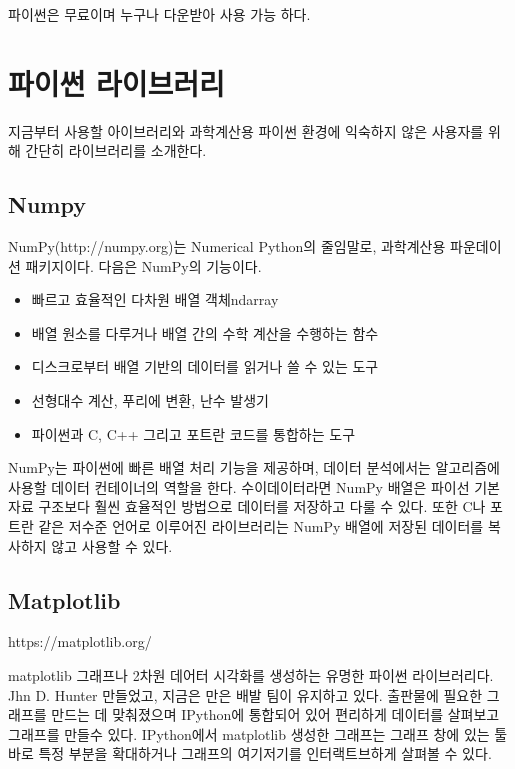 파이썬은 무료이며 누구나 다운받아 사용 가능 하다.



\section{파이썬 라이브러리}

지금부터 사용할 아이브러리와 과학계산용 파이썬 환경에 익숙하지 않은 사용자를 위해 간단히 라이브러리를 소개한다.

\subsection{Numpy}

NumPy(http://numpy.org)는 Numerical Python의 줄임말로, 과학계산용 파운데이션 패키지이다. 다음은 NumPy의 기능이다.


\begin{itemize}
	\item{빠르고 효율적인 다차원 배열 객체ndarray}
	\item{배열 원소를 다루거나 배열 간의 수학 계산을 수행하는 함수}
	\item{디스크로부터 배열 기반의 데이터를 읽거나 쓸 수 있는 도구}
	\item{선형대수 계산, 푸리에 변환, 난수 발생기}
	\item{파이썬과 C, C++ 그리고 포트란 코드를 통합하는 도구}
\end{itemize}


NumPy는 파이썬에 빠른 배열 처리 기능을 제공하며, 데이터 분석에서는 알고리즘에 사용할 데이터 컨테이너의 역할을 한다. 수이데이터라면 NumPy 배열은 파이선 기본 자료 구조보다 훨씬 효율적인 방법으로 데이터를 저장하고 다룰 수 있다. 또한 C나 포트란 같은 저수준 언어로 이루어진 라이브러리는 NumPy 배열에 저장된 데이터를 복사하지 않고 사용할 수 있다. 


\subsection{Matplotlib}

https://matplotlib.org/

matplotlib \은 그래프나 2차원 데어터 시각화를 생성하는 유명한 파이썬 라이브러리다. Jhn D. Hunter \가 만들었고, 지금은 만은 배발 팀이 유지하고 있다. 출판물에 필요한 그래프를 만드는 데 맞춰졌으며 IPython에 통합되어 있어 편리하게 데이터를 살펴보고 그래프를 만들수 있다. IPython에서 matplotlib \로 생성한 그래프는 그래프 창에 있는 툴바로 특정 부분을 확대하거나 그래프의 여기저기를 인터랙트브하게 살펴볼 수 있다.


